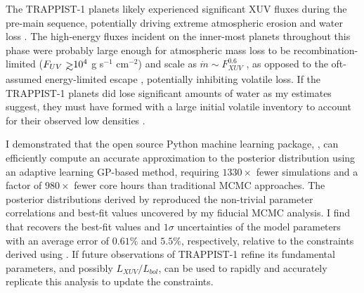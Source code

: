 The TRAPPIST-1 planets likely experienced significant XUV fluxes during the pre-main sequence, potentially driving extreme atmospheric erosion and water loss \citep{Bolmont2017,Bourrier2017a}. The high-energy fluxes incident on the inner-most planets throughout this phase were probably large enough for atmospheric mass loss to be recombination-limited ($F_{UV} \gsim 10^4$ g s$^{-1}$ cm$^{-2}$) and scale as $\dot{m} \sim F_{XUV}^{0.6}$ \citep{MurrayClay2009}, as opposed to the oft-assumed energy-limited escape \citep[$\dot{m} \sim F_{XUV}$,][]{Watson1981,Lammer2003}, potentially inhibiting volatile loss. If the TRAPPIST-1 planets did lose significant amounts of water as my estimates suggest, they must have formed with a large initial volatile inventory to account for their observed low densities \citep{Grimm2018}.

I demonstrated that the open source Python machine learning package, \approxposterior \citep{FlemingVanderPlas2018}, can efficiently compute an accurate approximation to the posterior distribution using an adaptive learning GP-based method, requiring $1330\times$ fewer \vplanet simulations and a factor of $980\times$ fewer core hours than traditional MCMC approaches. The posterior distributions derived by \approxposterior reproduced the non-trivial parameter correlations and best-fit values uncovered by my fiducial MCMC analysis. I find that \approxposterior recovers the best-fit values and $1\sigma$ uncertainties of the model parameters with an average error of $0.61\%$ and $5.5\%$, respectively, relative to the constraints derived using \emcee. If future observations of TRAPPIST-1 refine its fundamental parameters, and possibly $L_{XUV}/L_{bol}$, \approxposterior can be used to rapidly and accurately replicate this analysis to update the constraints.  



